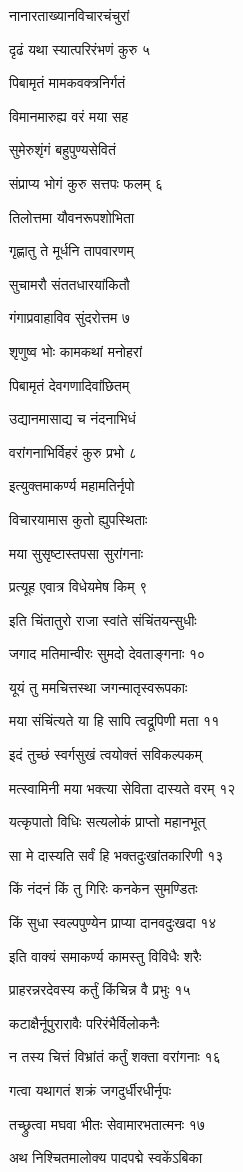 नानारताख्यानविचारचंचुरां

दृढं यथा स्यात्परिरंभणं कुरु ५

पिबामृतं मामकवक्त्रनिर्गतं

विमानमारुह्य वरं मया सह

सुमेरुशृंगं बहुपुण्यसेवितं

संप्राप्य भोगं कुरु सत्तपः फलम् ६

तिलोत्तमा यौवनरूपशोभिता

गृह्णातु ते मूर्धनि तापवारणम्

सुचामरौ संततधारयांकितौ

गंगाप्रवाहाविव सुंदरोत्तम ७

शृणुष्व भोः कामकथां मनोहरां

पिबामृतं देवगणादिवांछितम्

उद्यानमासाद्य च नंदनाभिधं

वरांगनाभिर्विहरं कुरु प्रभो ८

इत्युक्तमाकर्ण्य महामतिर्नृपो

विचारयामास कुतो ह्युपस्थिताः

मया सुसृष्टास्तपसा सुरांगनाः

प्रत्यूह एवात्र विधेयमेष किम् ९

इति चिंतातुरो राजा स्वांते संचिंतयन्सुधीः

जगाद मतिमान्वीरः सुमदो देवताङ्गनाः १०

यूयं तु ममचित्तस्था जगन्मातृस्वरूपकाः

मया संचिंत्यते या हि सापि त्वद्रूपिणी मता ११

इदं तुच्छं स्वर्गसुखं त्वयोक्तं सविकल्पकम्

मत्स्वामिनी मया भक्त्या सेविता दास्यते वरम् १२

यत्कृपातो विधिः सत्यलोकं प्राप्तो महानभूत्

सा मे दास्यति सर्वं हि भक्तदुःखांतकारिणी १३

किं नंदनं किं तु गिरिः कनकेन सुमण्डितः

किं सुधा स्वल्पपुण्येन प्राप्या दानवदुःखदा १४

इति वाक्यं समाकर्ण्य कामस्तु विविधैः शरैः

प्राहरन्नरदेवस्य कर्तुं किंचिन्न वै प्रभुः १५

कटाक्षैर्नूपुरारावैः परिरंभैर्विलोकनैः

न तस्य चित्तं विभ्रांतं कर्तुं शक्ता वरांगनाः १६

गत्वा यथागतं शक्रं जगदुर्धीरधीर्नृपः

तच्छ्रुत्वा मघवा भीतः सेवामारभतात्मनः १७

अथ निश्चितमालोक्य पादपद्मे स्वकेंऽबिका

